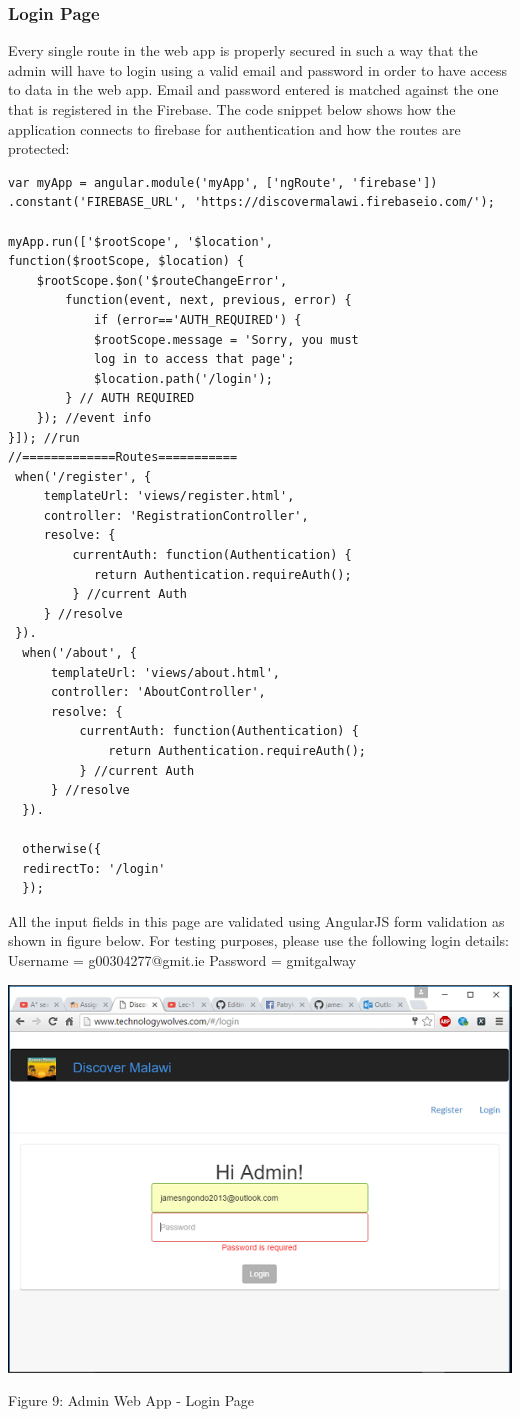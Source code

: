 \subsubsection{Login Page}
Every single route in the web app is properly secured in such a way that the admin will have to login using a valid email and password in order to have access to data in the web app. Email and password entered is matched against the one that is registered in the Firebase. The code snippet below shows how the application connects to firebase for authentication and how the routes are protected:
\begin{verbatim}
var myApp = angular.module('myApp', ['ngRoute', 'firebase'])
.constant('FIREBASE_URL', 'https://discovermalawi.firebaseio.com/');

myApp.run(['$rootScope', '$location',
function($rootScope, $location) {
	$rootScope.$on('$routeChangeError',
		function(event, next, previous, error) {
			if (error=='AUTH_REQUIRED') {
			$rootScope.message = 'Sorry, you must 
			log in to access that page';
			$location.path('/login');
		} // AUTH REQUIRED
	}); //event info
}]); //run
//=============Routes===========
 when('/register', {
	 templateUrl: 'views/register.html',
	 controller: 'RegistrationController',
	 resolve: {
		 currentAuth: function(Authentication) {
			return Authentication.requireAuth();
		 } //current Auth
	 } //resolve
 }).
  when('/about', {
	  templateUrl: 'views/about.html',
	  controller: 'AboutController',
	  resolve: {
		  currentAuth: function(Authentication) {
			  return Authentication.requireAuth();
		  } //current Auth
	  } //resolve
  }).
    
  otherwise({
  redirectTo: '/login'
  });
\end{verbatim}



All the input fields in this page are validated using AngularJS form validation as shown in figure below. 
For testing purposes, please use the following login details:
Username = g00304277@gmit.ie
Password = gmitgalway

\begin{center}    
	\includegraphics{img/login.png}
\end{center}
\begin{center}
	Figure 9: Admin Web App - Login Page
\end{center}
